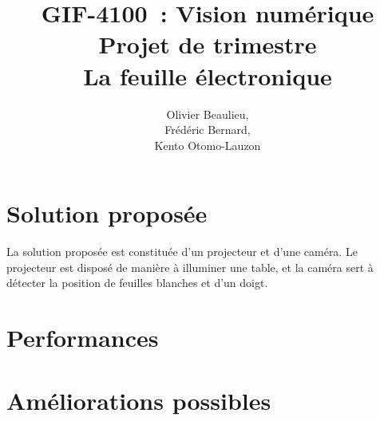 \documentclass[11pt]{report}
\title{\textbf{GIF-4100 : Vision numérique\\ Projet de trimestre \\La feuille électronique}}
\author{Olivier Beaulieu,\\Frédéric Bernard,\\Kento Otomo-Lauzon}
\begin{document}
\maketitle
 

\newpage

\section{Solution proposée}
La solution proposée est constituée d'un projecteur et d'une caméra. Le
projecteur est disposé de manière à illuminer une table, et la caméra sert à
détecter la position de feuilles blanches et d'un doigt.





\section{Performances}

\section{Améliorations possibles}
\end{document}
